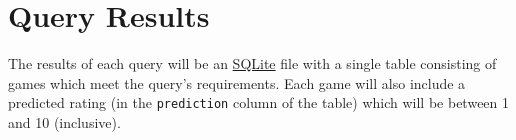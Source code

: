 \documentclass{article}
\newcommand{\code}[1]{\texttt{#1}}
\begin{document}
\section{Query Results}
\noindent The results of each query will be an \href{https://www.sqlite.org/}{SQLite} file with a single table consisting of games which meet the query's requirements. Each game will also include a predicted rating (in the \code{prediction} column of the table) which will be between 1 and 10 (inclusive).

\label{LastPage}
\end{document}
